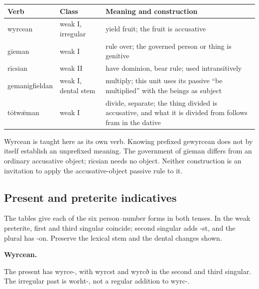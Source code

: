 \par\begingroup
\fontsize{10.5}{13.2}\selectfont
\setlength{\LTleft}{0pt}\setlength{\LTright}{\fill}
\noindent
\begin{tabular}{@{}>{\raggedright\arraybackslash}p{26mm}>{\raggedright\arraybackslash}p{23mm}>{\raggedright\arraybackslash}p{69.37mm}@{}}
\toprule
\textbf{Verb} & \textbf{Class} & \textbf{Meaning and construction} \\
\midrule
wyrcean & weak I, irregular & yield fruit; the fruit is accusative \\
gīeman & weak I & rule over; the governed person or thing is genitive \\
rīcsian & weak II & have dominion, bear rule; used intransitively \\
gemanigfieldan & weak I, dental stem & multiply; this unit uses its passive “be multiplied” with the beings as subject \\
tōtwǣman & weak I & divide, separate; the thing divided is accusative, and what it is divided from follows fram in the dative \\
\bottomrule
\end{tabular}
\par\endgroup

Wyrcean is taught here as its own verb. Knowing prefixed gewyrcean does not by itself establish an unprefixed meaning. The government of gīeman differs from an ordinary accusative object; rīcsian needs no object. Neither construction is an invitation to apply the accusative-object passive rule to it.

\subsection*{Present and preterite indicatives}

The tables give each of the six person–number forms in both tenses. In the weak preterite, first and third singular coincide; second singular adds -st, and the plural has -on. Preserve the lexical stem and the dental changes shown.

\textbf{Wyrcean.}

The present has wyrce-, with wyrcst and wyrcð in the second and third singular. The irregular past is worht-, not a regular addition to wyrc-.

